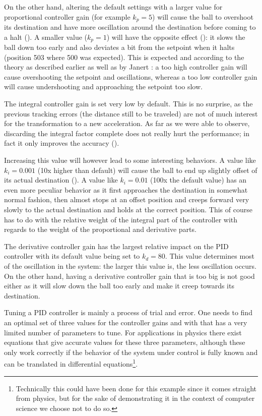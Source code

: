 On the other hand, altering the default settings with a larger value for proportional controller gain (for example $k_p = 5$) will cause the ball to overshoot its destination and have more oscillation around the destination before coming to a halt (). A smaller value ($k_p = 1$) will have the opposite effect (): it slows the ball down too early and also deviates a bit from the setpoint when it halts (position 503 where 500 was expected). This is expected and according to the theory as described earlier as well as by Janert \cite{janert2013-feedback}: a too high controller gain will cause overshooting the setpoint and oscillations, whereas a too low controller gain will cause undershooting and approaching the setpoint too slow.

The integral controller gain is set very low by default. This is no surprise, as the previous tracking errors (the distance still to be traveled) are not of much interest for the transformation to a new acceleration. As far as we were able to observe, discarding the integral factor complete does not really hurt the performance; in fact it only improves the accuracy ().

Increasing this value will however lead to some interesting behaviors. A value like $k_i = 0.001$ (10x higher than default) will cause the ball to end up slightly offset of its actual destination (). A value like $k_i = 0.01$ (100x the default value) has an even more peculiar behavior as it first approaches the destination in somewhat normal fashion, then almost stops at an offset position and creeps forward very slowly to the actual destination and holds at the correct position. This of course has to do with the relative weight of the integral part of the controller with regards to the weight of the proportional and derivative parts.

The derivative controller gain has the largest relative impact on the PID controller with its default value being set to $k_d = 80$. This value determines most of the oscillation in the system: the larger this value is, the less oscillation occurs. On the other hand, having a derivative controller gain that is too big is not good either as it will slow down the ball too early and make it creep towards its destination.

Tuning a PID controller is mainly a process of trial and error. One needs to find an optimal set of three values for the controller gains and with that has a very limited number of parameters to tune. For applications in physics there exist equations that give accurate values for these three parameters, although these only work correctly if the behavior of the system under control is fully known and can be translated in differential equations\footnote{Technically this could have been done for this example since it comes straight from physics, but for the sake of demonstrating it in the context of computer science we choose not to do so.}.

